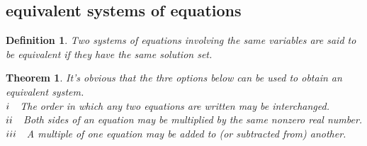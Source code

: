 \documentclass[a4paper,12pt]{report}
\newtheorem{theorem}{Theorem}[section]      %
\newtheorem{definition}{Definition}[section]     %
\begin{document}
\subsection{equivalent systems of equations}
\begin{definition}
    Two systems of equations involving the same variables are said to be equivalent if they have the same solution set.
\end{definition}
\begin{theorem} \label{Theorem2.1.1}
    It's obvious that the thre options below can be used to obtain an equivalent system.\\
    $\uppercase\expandafter{\romannumeral1}\quad$The order in which any two equations are written may be interchanged.\\
    $\uppercase\expandafter{\romannumeral2}\quad$Both sides of an equation may be multiplied by the same nonzero real number.\\
    $\uppercase\expandafter{\romannumeral3}\quad$A multiple of one equation may be added to (or subtracted from) another.\\
\end{theorem}
\end{document}
